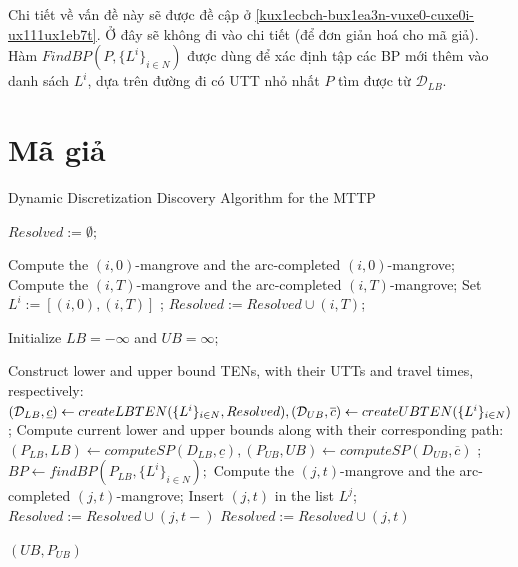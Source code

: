 \documentclass[../main.tex]{subfiles}
\begin{document}
Chi tiết về vấn đề này sẽ được đề cập ở \autoref{kux1ecbch-bux1ea3n-vuxe0-cuxe0i-ux111ux1eb7t}. 
Ở đây sẽ không đi vào chi tiết (để đơn giản hoá cho mã giả). Hàm \(FindBP(P, \{L^i\}_{i\in N})\) được dùng để xác định tập các BP
mới thêm vào danh sách \(L^i\), dựa trên đường đi có UTT nhỏ nhất
\(P\) tìm được từ \(\mathcal{D}_{LB}\). 

\section{Mã giả}

\begin{algorithm}[H]
\caption{Dynamic Discretization Discovery Algorithm for the MTTP}
\label{algo:2}
\begin{algorithmic}
    
\State $Resolved := \emptyset;$


    \State Compute the $(i, 0)$-mangrove and the arc-completed $(i, 0)$-mangrove; 
    \State Compute the $(i, T)$-mangrove and the arc-completed $(i, T)$-mangrove; 
    \State Set $L^i := [(i, 0), (i, T )]$ ;
    \State $Resolved := Resolved \cup {(i, T )}$;
\EndFor

\State Initialize $LB = −\infty$ and $UB = \infty$; 

    \State Construct lower and upper bound TENs, with their UTTs and travel times, respectively:
        \State  $(\mathcal{D}_{LB},\underline{c}) \gets createLBTEN(\{L^i\}_{i\in N},Resolved), \\(\mathcal{D}_{UB},\overline{c}) \gets createUBTEN(\{L^i\}_{i\in N})$ ;
    \State Compute current lower and upper bounds along with their corresponding path:
        \State  $(P_{LB},LB)\gets computeSP(D_{LB},\underline{c}),(P_{UB},UB) \gets computeSP(D_{UB},\overline{c})$ ;
    \State $BP \gets findBP(P_{LB},\{L^i\}_{i\in N}) ;$
    \EndFor 
        \State Compute the $(j, t)$-mangrove and the arc-completed $(j, t)$-mangrove;
        \State Insert $(j,t)$ in the list $L^j$;
        \State          $Resolved := Resolved \cup {(j, t−)}$
        \EndIf
        \State  $Resolved := Resolved \cup {(j, t)}$ 

        \EndIf  
\EndWhile

\Return $(UB,P_{UB})$

    \end{algorithmic}
\end{algorithm}

\backmatter
\end{document}
